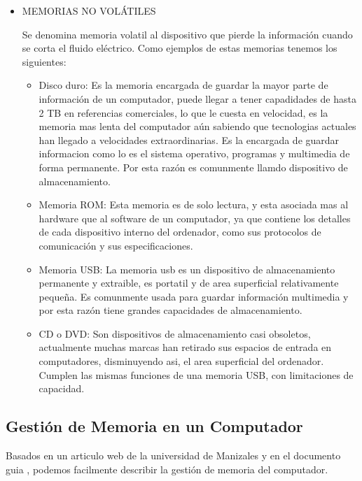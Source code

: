 \documentclass{article}
\begin{document}
\begin{itemize}
\begin{itemize}
    \end{itemize}
    
    \item
    MEMORIAS NO VOLÁTILES
    
    Se denomina memoria volatil al dispositivo que pierde la información cuando se corta el fluido eléctrico. Como ejemplos de estas memorias tenemos los siguientes:
    \begin{itemize}
        \item
        Disco duro: Es la memoria encargada de guardar la mayor parte de información de un computador, puede llegar a tener capadidades de hasta 2 TB en referencias comerciales, lo que le cuesta en velocidad, es la memoria mas lenta del computador aún sabiendo que tecnologias actuales han llegado a velocidades extraordinarias. Es la encargada de guardar informacion como lo es el sistema operativo, programas y multimedia de forma permanente. Por esta razón es comunmente llamdo dispositivo de almacenamiento.
        
        \item
        Memoria ROM: Esta memoria es de solo lectura, y esta asociada mas al hardware que al software de un computador, ya que contiene los detalles de cada dispositivo interno del ordenador, como sus protocolos de comunicación y sus especificaciones.
        
        \item
        Memoria USB: La memoria usb es un dispositivo de almacenamiento permanente y extraible, es portatil y de area superficial relativamente pequeña. Es comunmente usada para guardar información multimedia y por esta razón tiene grandes capacidades de almacenamiento.
        
        
        \item
        CD o DVD: Son dispositivos de almacenamiento casi obsoletos, actualmente muchas marcas han retirado sus espacios de entrada en computadores, disminuyendo asi, el area superficial del ordenador. Cumplen las mismas funciones de una memoria USB, con limitaciones de capacidad.
    
    \end{itemize}
    
    
\end{itemize}

\subsection{Gestión de Memoria en un Computador}\label{pregunta3}
Basados en un articulo web de la universidad de Manizales \cite{UdeMa} y en el documento guia \cite{referencia}, podemos facilmente describir la gestión de memoria del computador.
\end{document}
